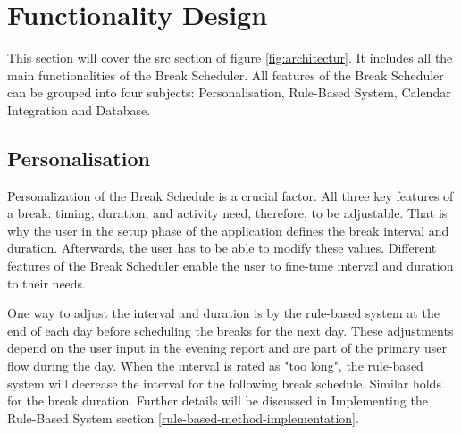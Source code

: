 \documentclass{hasel_thesis}
\begin{document}
\section{Functionality Design}

This section will cover the src section of figure \ref{fig:architectur}. It includes all the main functionalities of the Break Scheduler. All features of the Break Scheduler can be grouped into four subjects: Personalisation, Rule-Based System, Calendar Integration and Database.

\subsection{Personalisation} \label{personalization}
Personalization of the Break Schedule is a crucial factor. All three key features of a break: timing, duration, and activity need, therefore, to be adjustable. That is why the user in the setup phase of the application defines the break interval and duration. Afterwards, the user has to be able to modify these values. Different features of the Break Scheduler enable the user to fine-tune interval and duration to their needs.

One way to adjust the interval and duration is by the rule-based system at the end of each day before scheduling the breaks for the next day. These adjustments depend on the user input in the evening report and are part of the primary user flow during the day. When the interval is rated as "too long", the rule-based system will decrease the interval for the following break schedule. Similar holds for the break duration. Further details will be discussed in Implementing the Rule-Based System section \ref{rule-based-method-implementation}.
\end{document}

